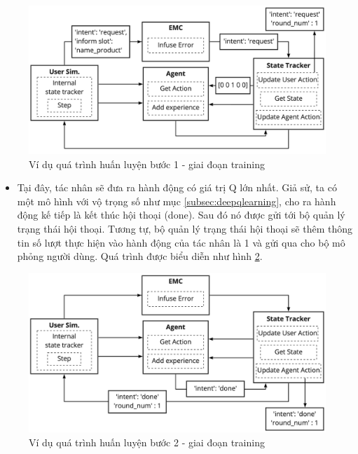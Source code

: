 \begin{figure}[ht!]
    \centering
    \includegraphics[scale=0.15]{thesis/chatbot/phuongphap/img/training_exam.jpg}
    \caption{Ví dụ quá trình huấn luyện bước 1 - giai đoạn training}
    \label{fig:examtraining}
\end{figure}

\begin{itemize}
    \item Tại đây, tác nhân sẽ đưa ra hành động có giá trị Q
    lớn nhất. Giả sử, ta có một mô hình với vộ trọng số như mục
    \ref{subsec:deepqlearning}, cho ra hành động kế tiếp là kết thúc
    hội thoại (done). Sau đó nó được gửi tới bộ quản lý trạng thái
    hội thoại. Tương tự, bộ quản lý trạng thái hội thoại sẽ thêm
    thông tin số lượt thực hiện vào hành động của tác nhân là 1 và
    gửi qua cho bộ mô phỏng người dùng. Quá trình được biểu diễn
    như hình \ref{fig:examtraining1}.
\end{itemize}

\begin{figure}[ht!]
    \centering
    \includegraphics[scale=0.16]{thesis/chatbot/phuongphap/img/training_exam1.jpg}
    \caption{Ví dụ quá trình huấn luyện bước 2 - giai đoạn training}
    \label{fig:examtraining1}
\end{figure}

